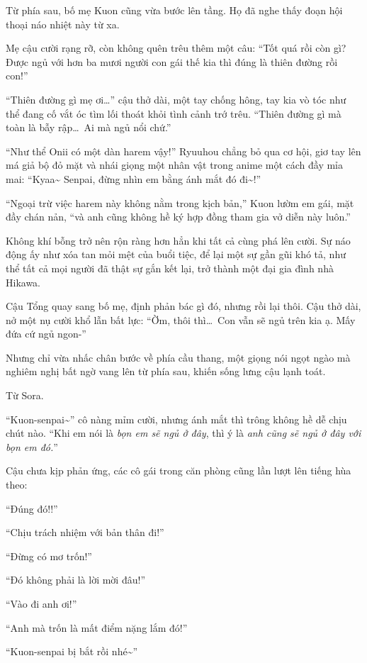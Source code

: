 \documentclass[../main.tex]{subfiles}
\begin{document}
Từ phía sau, bố mẹ Kuon cũng vừa bước lên tầng. Họ đã nghe thấy đoạn hội thoại náo nhiệt này từ xa.

Mẹ cậu cười rạng rỡ, còn không quên trêu thêm một câu: ``Tốt quá rồi còn gì? Được ngủ với hơn ba mươi người con gái thế kia thì đúng là thiên đường rồi con!''

``Thiên đường gì mẹ ơi\dots'' cậu thở dài, một tay chống hông, tay kia vò tóc như thể đang cố vắt óc tìm lối thoát khỏi tình cảnh trớ trêu. ``Thiên đường gì mà toàn là bẫy rập\dots\ Ai mà ngủ nổi chứ.''

``Như thể Onii có một dàn harem vậy!'' Ryuuhou chẳng bỏ qua cơ hội, giơ tay lên má giả bộ đỏ mặt và nhái giọng một nhân vật trong anime một cách đầy mỉa mai: ``Kyaa\~{} Senpai, đừng nhìn em bằng ánh mắt đó đi\~{}!''

``Ngoại trừ việc harem này không nằm trong kịch bản,'' Kuon lườm em gái, mặt đầy chán nản, ``và anh cũng không hề ký hợp đồng tham gia vở diễn này luôn.''

Không khí bỗng trở nên rộn ràng hơn hẳn khi tất cả cùng phá lên cười. Sự náo động ấy như xóa tan mỏi mệt của buổi tiệc, để lại một sự gần gũi khó tả, như thể tất cả mọi người đã thật sự gắn kết lại, trở thành một đại gia đình nhà Hikawa.

Cậu Tổng quay sang bố mẹ, định phản bác gì đó, nhưng rồi lại thôi. Cậu thở dài, nở một nụ cười khổ lẫn bất lực: ``Ờm, thôi thì\dots\ Con vẫn sẽ ngủ trên kia ạ. Mấy đứa cứ ngủ ngon-''

Nhưng chỉ vừa nhấc chân bước về phía cầu thang, một giọng nói ngọt ngào mà nghiêm nghị bất ngờ vang lên từ phía sau, khiến sống lưng cậu lạnh toát.

Từ Sora.

``Kuon-senpai\~{}'' cô nàng mỉm cười, nhưng ánh mắt thì trông không hề dễ chịu chút nào.  ``Khi em nói là \emph{bọn em sẽ ngủ ở đây}, thì ý là \emph{anh cũng sẽ ngủ ở đây với bọn em đó.}''

Cậu chưa kịp phản ứng, các cô gái trong căn phòng cũng lần lượt lên tiếng hùa theo:

``Đúng đó!!''

``Chịu trách nhiệm với bản thân đi!''

``Đừng có mơ trốn!''

``Đó không phải là lời mời đâu!''

``Vào đi anh ơi!''

``Anh mà trốn là mất điểm nặng lắm đó!''

``Kuon-senpai bị bắt rồi nhé\~{}''
\end{document}
